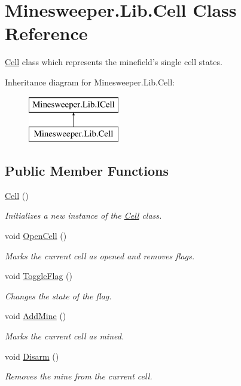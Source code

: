 \hypertarget{class_minesweeper_1_1_lib_1_1_cell}{\section{Minesweeper.\+Lib.\+Cell Class Reference}
\label{class_minesweeper_1_1_lib_1_1_cell}
}


\hyperlink{class_minesweeper_1_1_lib_1_1_cell}{Cell} class which represents the minefield's single cell states.  


Inheritance diagram for Minesweeper.\+Lib.\+Cell\+:\begin{figure}[H]
\begin{center}
\leavevmode
\includegraphics[height=2.000000cm]{class_minesweeper_1_1_lib_1_1_cell}
\end{center}
\end{figure}
\subsection*{Public Member Functions}
\begin{DoxyCompactItemize}
\item 
\hyperlink{class_minesweeper_1_1_lib_1_1_cell_a2dd45aa4466e64696feb140d13cf0899}{Cell} ()
\begin{DoxyCompactList}\small\item\em Initializes a new instance of the \hyperlink{class_minesweeper_1_1_lib_1_1_cell}{Cell} class. \end{DoxyCompactList}\item 
void \hyperlink{class_minesweeper_1_1_lib_1_1_cell_a5fa36c247bd91a482ac46ebf7d2f38b8}{Open\+Cell} ()
\begin{DoxyCompactList}\small\item\em Marks the current cell as opened and removes flags. \end{DoxyCompactList}\item 
void \hyperlink{class_minesweeper_1_1_lib_1_1_cell_a0f959eea2ba69dfa8fcb0ee72e8b33ca}{Toggle\+Flag} ()
\begin{DoxyCompactList}\small\item\em Changes the state of the flag. \end{DoxyCompactList}\item 
void \hyperlink{class_minesweeper_1_1_lib_1_1_cell_a64366640c2cb5425cc73817827d291c4}{Add\+Mine} ()
\begin{DoxyCompactList}\small\item\em Marks the current cell as mined. \end{DoxyCompactList}\item 
void \hyperlink{class_minesweeper_1_1_lib_1_1_cell_ad69f61697ceb611c855f3c4e48f60eb4}{Disarm} ()
\begin{DoxyCompactList}\small\item\em Removes the mine from the current cell. \end{DoxyCompactList}\end{DoxyCompactItemize}
